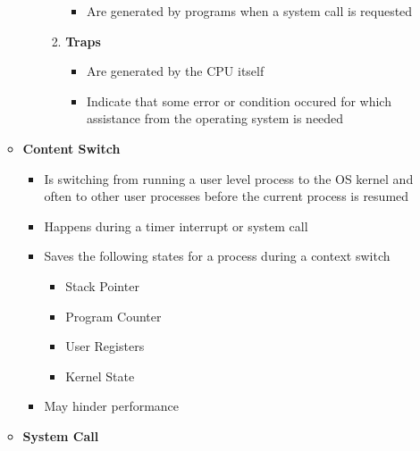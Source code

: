 \documentclass[12pt]{article}
\begin{document}
\begin{enumerate}[1.]
\begin{itemize}
\begin{itemize}
\begin{enumerate}[1)]
                \begin{itemize}
                    \item Are generated by programs when a system call is requested
                \end{itemize}

                \bigskip

                \item \textbf{Traps}

                \bigskip

                \begin{itemize}
                    \item Are generated by the CPU itself
                    \item Indicate that some error or condition occured for which assistance from the operating system is needed
                \end{itemize}

                \bigskip
            \end{enumerate}
        \end{itemize}

        \item \textbf{Content Switch}

        \begin{itemize}
            \item Is switching from running a user level process to the OS kernel and often
            to other user processes before the current process is resumed
            \item Happens during a timer interrupt or system call
            \item Saves the following states for a process during a context switch
            \begin{itemize}
                \item Stack Pointer
                \item Program Counter
                \item User Registers
                \item Kernel State
            \end{itemize}
            \item May hinder performance
        \end{itemize}

        \item \textbf{System Call}

        \bigskip


\end{itemize}
\end{enumerate}
\end{document}
